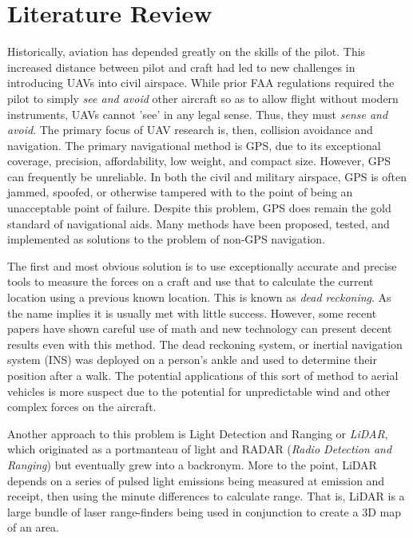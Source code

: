 \documentclass[]{article}
\begin{document}
\section{Literature Review}
    Historically, aviation has depended greatly on the skills of the pilot. This increased distance between pilot and craft had led to new challenges in introducing UAVs into civil airspace. While prior FAA regulations required the pilot to simply \emph{see and avoid} other aircraft so as to allow flight without modern instruments, UAVs cannot 'see' in any legal sense. Thus, they must \emph{sense and avoid}. The primary focus of UAV research is, then, collision avoidance and navigation. The primary navigational method is GPS, due to its exceptional coverage, precision, affordability, low weight, and compact size. However, GPS can frequently be unreliable. In both the civil and military airspace, GPS is often jammed, spoofed, or otherwise tampered with \cite{tag1} to the point of being an unacceptable point of failure. Despite this problem, GPS does remain the gold standard of navigational aids. Many methods have been proposed, tested, and implemented as solutions to the problem of non-GPS navigation. \newline
	
	The first and most obvious solution is to use exceptionally accurate and precise tools to measure the forces on a craft and use that to calculate the current location using a previous known location. This is known as {\em dead reckoning}. As the name implies it is usually met with little success. However, some recent papers \cite{tag2} have shown careful use of math and new technology can present decent results even with this method. The dead reckoning system, or inertial navigation system (INS) was deployed on a person's ankle and used to determine their position after a walk. The potential applications of this sort of method to aerial vehicles is more suspect due to the potential for unpredictable wind and other complex forces on the aircraft. \newline
	
    Another approach to this problem is Light Detection and Ranging or {\em LiDAR}, which originated as a portmanteau of light and RADAR ({\em Radio Detection and Ranging}) but eventually grew into a backronym. More to the point, LiDAR depends on a series of pulsed light emissions being measured at emission and receipt, then using the minute differences to calculate range. That is, LiDAR is a large bundle of laser range-finders being used in conjunction to create a 3D map of an area.\newline
    	
\end{document}
